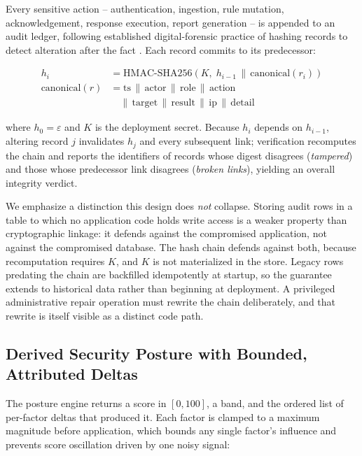 \documentclass[conference]{IEEEtran}
\begin{document}
Every sensitive action -- authentication, ingestion, rule mutation,
acknowledgement, response execution, report generation -- is appended to an
audit ledger, following established digital-forensic practice of hashing
records to detect alteration after the fact \cite{mccabe2024logging}.
Each record commits to its predecessor:

\begin{align}
h_i &= \text{HMAC}\text{-}\text{SHA256}\!\left(K,\; h_{i-1} \,\|\, \text{canonical}(r_i)\right) \\
\text{canonical}(r) &= \text{ts} \,\|\, \text{actor} \,\|\, \text{role} \,\|\, \text{action} \\
&\quad \|\, \text{target} \,\|\, \text{result} \,\|\, \text{ip} \,\|\, \text{detail}
\end{align}

\noindent where $h_0 = \varepsilon$ and $K$ is the deployment secret. Because
$h_i$ depends on $h_{i-1}$, altering record $j$ invalidates $h_j$ and every
subsequent link; verification recomputes the chain and reports the
identifiers of records whose digest disagrees (\textit{tampered}) and those
whose predecessor link disagrees (\textit{broken links}), yielding an overall
integrity verdict.

We emphasize a distinction this design does \emph{not} collapse. Storing
audit rows in a table to which no application code holds write access is a
weaker property than cryptographic linkage: it defends against the
compromised application, not against the compromised database. The hash chain
defends against both, because recomputation requires $K$, and $K$ is not
materialized in the store. Legacy rows predating the chain are backfilled
idempotently at startup, so the guarantee extends to historical data rather
than beginning at deployment. A privileged administrative repair operation
must rewrite the chain deliberately, and that rewrite is itself visible as a
distinct code path.

\subsection{Derived Security Posture with Bounded, Attributed Deltas}

The posture engine returns a score in $[0,100]$, a band, and the ordered
list of per-factor deltas that produced it. Each factor is clamped to a
maximum magnitude before application, which bounds any single factor's
influence and prevents score oscillation driven by one noisy signal:
\end{document}
